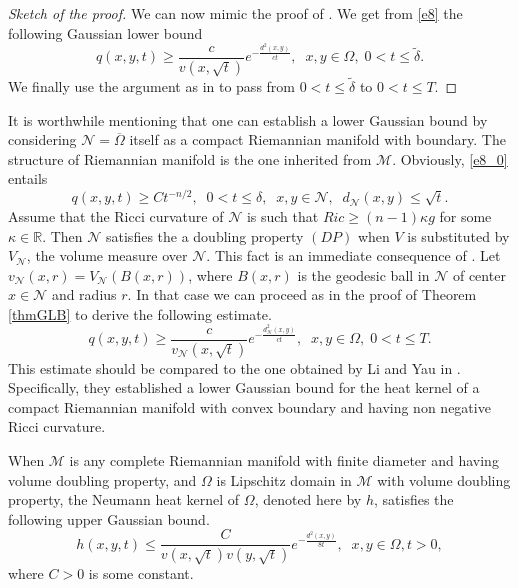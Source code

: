 \documentclass{birkjour}
\begin{document}
\begin{proof}[Sketch of the proof]
\smallskip
We can now mimic the proof of \cite[Theorem 7.29, page 248]{Ou}. We get from \eqref{e8} the following Gaussian lower bound
\[
q(x,y,t)\geq \frac{c}{v(x,\sqrt{t})}e^{-\frac{d^2(x,y)}{ct}}, \;\; x,y\in \Omega ,\; 0<t\leq \widetilde{\delta}.
\]
We finally use the argument as in \cite[Theorem 3.1]{CK} to pass from $0<t\leq \widetilde{\delta}$ to $0<t\leq T$.
\end{proof}

It is worthwhile mentioning that one can establish a lower Gaussian bound by considering $\mathcal{N}=\overline{\Omega}$ itself as a compact Riemannian manifold with boundary. The structure of Riemannian manifold is the one inherited from $\mathcal{M}$. Obviously, \eqref{e8_0} entails
\begin{equation}\label{e11}
q(x,y,t)\geq Ct^{-n/2},\;\;  0<t\leq \delta ,\;\; x, y\in \mathcal{N},\;\; d_\mathcal{N} (x,y)\leq \sqrt{t}.
\end{equation}
Assume that the Ricci curvature of $\mathcal{N}$ is such that $Ric\geq (n-1)\kappa g$ for some $\kappa \in \mathbb{R}$. Then $\mathcal{N}$ satisfies the a doubling property $(DP)$ when $V$ is substituted by $V_\mathcal{N}$, the volume measure over $\mathcal{N}$. This fact is an immediate consequence of \cite[formula in the bottom of page 7]{He}. Let $v_\mathcal{N}(x,r)=V_\mathcal{N}(B(x,r))$, where $B(x,r)$ is the geodesic ball in $\mathcal{N}$ of center $x\in \mathcal{N}$ and radius $r$. In that case we can proceed as in the proof of Theorem \ref{thmGLB} to derive the following estimate.
\[
q(x,y,t)\geq \frac{c}{v_\mathcal{N}(x,\sqrt{t})}e^{-\frac{d_\mathcal{N}^2(x,y)}{ct}}, \;\; x,y\in \Omega ,\; 0<t\leq T.
\]
This estimate should be compared to the one obtained by Li and Yau in \cite[Theorem 4.2, page 184]{LY}. Specifically, they established a lower Gaussian bound for the heat kernel of a compact Riemannian manifold with convex boundary and having non negative Ricci curvature.

\smallskip
When $\mathcal{M}$ is any complete Riemannian manifold with finite diameter and having volume doubling property, and $\Omega$ is Lipschitz domain in $\mathcal{M}$ with volume doubling property, the Neumann heat kernel of $\Omega$, denoted here by $h$, satisfies the following upper Gaussian bound.
\[
h(x,y,t)\le \frac{C}{v (x,\sqrt{t})v(y,\sqrt{t})}e^{-\frac{d^2(x,y)}{8t}},\;\; x,y\in \Omega ,t>0,
\]
where $C>0$ is some constant.
\end{document}
